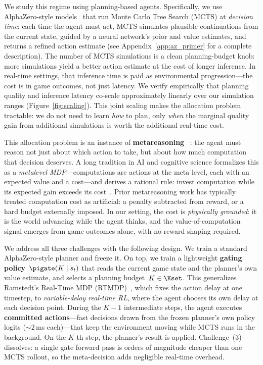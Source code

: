 We study this regime using planning-based agents.
Specifically, we use AlphaZero-style models~\citep{silver2018general} that run
Monte Carlo Tree Search (MCTS) at \emph{decision time}: each time the agent
must act, MCTS simulates plausible continuations from the current state,
guided by a neural network's prior and value estimates, and returns a refined
action estimate (see Appendix~\ref{app:az_primer} for a complete description).
The number of MCTS simulations is a clean planning-budget knob: more
simulations yield a better action estimate at the cost of longer inference.
In real-time settings, that inference time is paid as environmental
progression—the cost is in game outcomes, not just latency.
We verify empirically that planning quality and inference latency
co-scale approximately linearly over our simulation ranges
(Figure~\ref{fig:scaling}).
This joint scaling makes the allocation problem tractable: we do not need to
learn \emph{how} to plan, only \emph{when} the marginal quality gain from
additional simulations is worth the additional real-time cost.

This allocation problem is an instance of \textbf{metareasoning}~%
\citep{russell1991right}: the agent must reason not just about which action
to take, but about how much computation that decision deserves.
A long tradition in AI and cognitive science formalizes this as a
\emph{metalevel MDP}—computations are actions at the meta level, each with
an expected value and a cost—and derives a rational rule: invest computation
while its expected gain exceeds its cost~\citep{hay2012selecting,
lieder2017strategy, griffiths2019doing, callaway2018learning}.
Prior metareasoning work has typically treated computation cost as
artificial: a penalty subtracted from reward, or a hard budget externally
imposed.
In our setting, the cost is \emph{physically grounded}: it is the world
advancing while the agent thinks, and the value-of-computation signal emerges
from game outcomes alone, with no reward shaping required.

We address all three challenges with the following design.
We train a standard AlphaZero-style planner and freeze it.
On top, we train a lightweight \textbf{gating policy}~$\pigate(K \mid s_t)$
that reads the current game state and the planner's own value estimate, and
selects a planning budget~$K \in \Kset$.
This generalizes Ramstedt's Real-Time MDP (RTMDP)~\citep{ramstedt2019rtrl},
which fixes the action delay at one timestep, to \emph{variable-delay
real-time RL}, where the agent chooses its own delay at each decision point.
During the $K{-}1$ intermediate steps, the agent executes \textbf{committed
actions}—fast decisions drawn from the frozen planner's own policy logits
(${\sim}2\,$ms each)—that keep the environment moving while MCTS runs in the
background.
On the $K$-th step, the planner's result is applied.
Challenge~(3) dissolves: a single gate forward pass is orders of magnitude
cheaper than one MCTS rollout, so the meta-decision adds negligible real-time
overhead.

